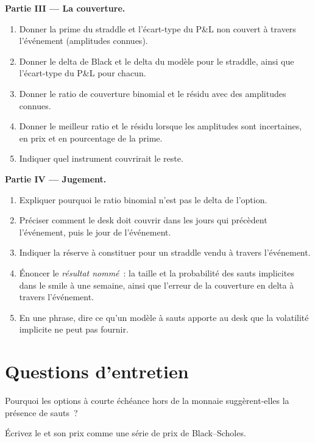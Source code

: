 \begin{problem}
\medskip\noindent\textbf{Partie III --- La couverture.}
\begin{enumerate}[resume]
\item Donner la prime du straddle et l'écart-type du P\&L non couvert à travers l'événement (amplitudes connues).
\item Donner le delta de Black et le delta du modèle pour le straddle, ainsi que l'écart-type du P\&L pour chacun.
\item Donner le ratio de couverture binomial et le résidu avec des amplitudes connues.
\item Donner le meilleur ratio et le résidu lorsque les amplitudes sont incertaines, en prix et en pourcentage de la prime.
\item Indiquer quel instrument couvrirait le reste.
\end{enumerate}

\medskip\noindent\textbf{Partie IV --- Jugement.}
\begin{enumerate}[resume]
\item Expliquer pourquoi le ratio binomial n'est pas le delta de l'option.
\item Préciser comment le desk doit couvrir dans les jours qui précèdent l'événement, puis le jour de l'événement.
\item Indiquer la réserve à constituer pour un straddle vendu à travers l'événement.
\item Énoncer le \emph{résultat nommé}~: la taille et la probabilité des sauts implicites dans le smile à une semaine, ainsi que l'erreur
de la couverture en delta à travers l'événement.
\item En une phrase, dire ce qu'un modèle à sauts apporte au desk que la volatilité implicite ne peut pas fournir.
\end{enumerate}
\end{problem}

\section{Questions d'entretien}

\begin{interviewq}\label{iq:dv:jumps-and-levy-models:1}
Pourquoi les options à courte échéance hors de la monnaie suggèrent-elles la présence de sauts~?
\end{interviewq}

\begin{interviewq}\label{iq:dv:jumps-and-levy-models:2}
Écrivez le  et son prix comme une série de prix de Black--Scholes.
\end{interviewq}

